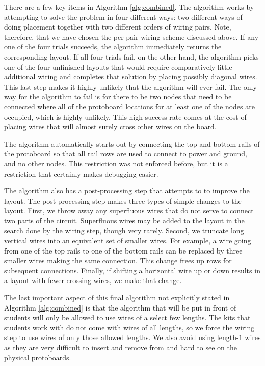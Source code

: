 There are a few key items in Algorithm \ref{alg:combined}. The algorithm works
by attempting to solve the problem in four different ways: two different ways of
doing placement together with two different orders of wiring pairs. Note,
therefore, that we have chosen the per-pair wiring scheme discussed above.
If any one of the four trials
succeeds, the algorithm immediately returns the corresponding layout. If all
four trials fail, on the other hand, the algorithm picks one of the four
unfinished layouts that would require comparatively little additional wiring and
completes that solution by placing possibly diagonal wires. This last step makes
it highly unlikely that the algorithm will ever fail.
The only way for the algorithm to fail is for there to be two nodes that need to be
connected where all of the protoboard locations for at least one of the nodes are
occupied, which is highly unlikely. This high success rate comes at the
cost of placing wires that will almost surely cross other wires on the board.

The algorithm automatically starts out by connecting the top and bottom rails
of the protoboard
so that all rail rows are used to connect to power and ground, and no other
nodes. This restriction was not enforced before, but it is a restriction that
certainly makes debugging easier.

The algorithm also has a post-processing step that attempts to to improve the
layout. The post-processing step makes three types of simple changes to the
layout. First, we throw away any superfluous wires that do not serve to connect
two parts of the circuit. Superfluous wires may be added to the layout
in the search done by the wiring step, though very rarely. Second, we truncate
long vertical wires into an equivalent set of smaller wires. For example, a wire
going from one of the top rails to one of the bottom rails can be replaced by
three smaller wires making the same connection. This change frees up rows for
subsequent connections. Finally, if shifting a horizontal wire up or down
results in a layout with fewer crossing wires, we make that change.

The last important aspect of this final algorithm not explicitly stated in
Algorithm \ref{alg:combined} is that the algorithm that will be put
in front of students will only be allowed to use wires of a select few lengths.
The kits that students work with do not come with wires of all lengths,
so we force the wiring step to use wires of only those allowed lengths. We also
avoid using length-$1$ wires as they are very difficult to insert and remove from
and hard to see on the physical protoboards.

